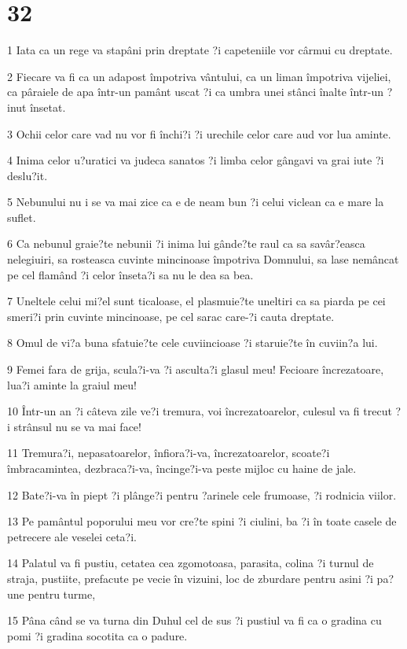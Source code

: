 \chapter{32}

\par 1 Iata ca un rege va stapâni prin dreptate ?i capeteniile vor cârmui cu dreptate.
\par 2 Fiecare va fi ca un adapost împotriva vântului, ca un liman împotriva vijeliei, ca pâraiele de apa într-un pamânt uscat ?i ca umbra unei stânci înalte într-un ?inut însetat.
\par 3 Ochii celor care vad nu vor fi închi?i ?i urechile celor care aud vor lua aminte.
\par 4 Inima celor u?uratici va judeca sanatos ?i limba celor gângavi va grai iute ?i deslu?it.
\par 5 Nebunului nu i se va mai zice ca e de neam bun ?i celui viclean ca e mare la suflet.
\par 6 Ca nebunul graie?te nebunii ?i inima lui gânde?te raul ca sa savâr?easca nelegiuiri, sa rosteasca cuvinte mincinoase împotriva Domnului, sa lase nemâncat pe cel flamând ?i celor înseta?i sa nu le dea sa bea.
\par 7 Uneltele celui mi?el sunt ticaloase, el plasmuie?te uneltiri ca sa piarda pe cei smeri?i prin cuvinte mincinoase, pe cel sarac care-?i cauta dreptate.
\par 8 Omul de vi?a buna sfatuie?te cele cuviincioase ?i staruie?te în cuviin?a lui.
\par 9 Femei fara de grija, scula?i-va ?i asculta?i glasul meu! Fecioare încrezatoare, lua?i aminte la graiul meu!
\par 10 Într-un an ?i câteva zile ve?i tremura, voi încrezatoarelor, culesul va fi trecut ?i strânsul nu se va mai face!
\par 11 Tremura?i, nepasatoarelor, înfiora?i-va, încrezatoarelor, scoate?i îmbracamintea, dezbraca?i-va, încinge?i-va peste mijloc cu haine de jale.
\par 12 Bate?i-va în piept ?i plânge?i pentru ?arinele cele frumoase, ?i rodnicia viilor.
\par 13 Pe pamântul poporului meu vor cre?te spini ?i ciulini, ba ?i în toate casele de petrecere ale veselei ceta?i.
\par 14 Palatul va fi pustiu, cetatea cea zgomotoasa, parasita, colina ?i turnul de straja, pustiite, prefacute pe vecie în vizuini, loc de zburdare pentru asini ?i pa?une pentru turme,
\par 15 Pâna când se va turna din Duhul cel de sus ?i pustiul va fi ca o gradina cu pomi ?i gradina socotita ca o padure.
